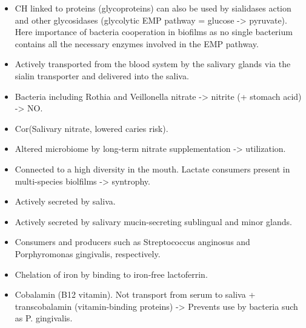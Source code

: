 \begin{tcolorbox}[
    title=Saliva,
    title filled=false,
    colback=blue!5!white,
    colframe=blue!75!black]
\begin{itemize}
\begin{itemize}
            as some dental products now contain arginine as an additive. 
            \item CH linked to proteins (glycoproteins) can also be used by sialidases action and other glycosidases 
            (glycolytic EMP pathway = glucose -> pyruvate). Here importance of bacteria cooperation in biofilms as no 
            single bacterium contains all the necessary enzymes involved in the EMP pathway. 
        \end{itemize}
        \begin{itemize}[Nitrate]
            \item Actively transported from the blood system by the salivary glands via the sialin transporter and delivered into the saliva. 
            \item Bacteria including Rothia and Veillonella nitrate -> nitrite (+ stomach acid) -> NO. 
            \item Cor(Salivary nitrate, lowered caries risk).
            \item Altered microbiome by long-term nitrate supplementation -> utilization.
        \end{itemize}
        \begin{itemize}[Lactate]
            \item Connected to a high diversity in the mouth. Lactate consumers present in multi-species biolfilms -> syntrophy. 
            \item Actively secreted by saliva.
        \end{itemize}
        \begin{itemize}[Bicarbonate]
            \item Actively secreted by salivary mucin-secreting sublingual and minor glands.
            \item Consumers and producers such as Streptococcus anginosus and Porphyromonas gingivalis, respectively.
        \end{itemize}
        \begin{itemize}[Limitation of other nutrients availability]
            \item Chelation of iron by binding to iron-free lactoferrin. 
            \item Cobalamin (B12 vitamin). Not transport from serum to saliva + transcobalamin 
            (vitamin-binding proteins) -> Prevents use by bacteria such as P. gingivalis. 
        \end{itemize}
    \end{itemize}


\end{tcolorbox}
